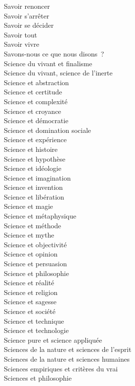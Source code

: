 \documentclass[a4paper,12pt]{article}
\begin{document}
Savoir renoncer \\
Savoir s'arrêter \\
Savoir se décider \\
Savoir tout \\
Savoir vivre \\
Savons-nous ce que nous disons ? \\
Science du vivant et finalisme \\
Science du vivant, science de l'inerte \\
Science et abstraction \\
Science et certitude \\
Science et complexité \\
Science et croyance \\
Science et démocratie \\
Science et domination sociale \\
Science et expérience \\
Science et histoire \\
Science et hypothèse \\
Science et idéologie \\
Science et imagination \\
Science et invention \\
Science et libération \\
Science et magie \\
Science et métaphysique \\
Science et méthode \\
Science et mythe \\
Science et objectivité \\
Science et opinion \\
Science et persuasion \\
Science et philosophie \\
Science et réalité \\
Science et religion \\
Science et sagesse \\
Science et société \\
Science et technique \\
Science et technologie \\
Science pure et science appliquée \\
Sciences de la nature et sciences de l'esprit \\
Sciences de la nature et sciences humaines \\
Sciences empiriques et critères du vrai \\
Sciences et philosophie \\
\end{document}
